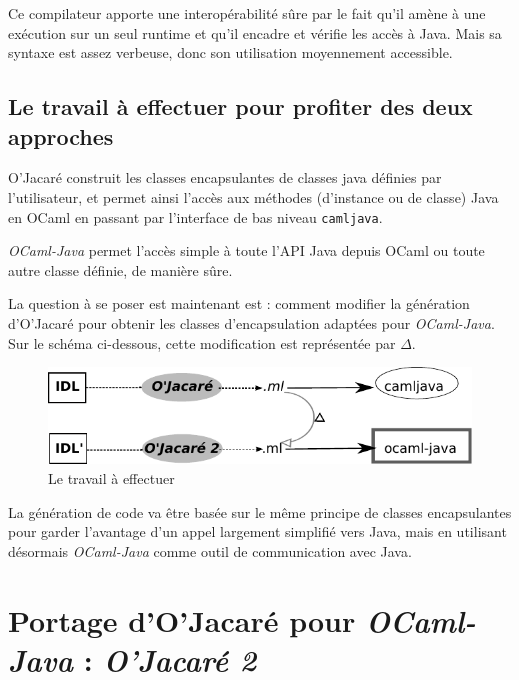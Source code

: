 \documentclass[a4paper, 11pt]{article}
\newcommand{\camljava}{{\tt{camljava}}}
\begin{document}
Ce compilateur apporte une interopérabilité sûre par le fait qu'il amène à une exécution sur un seul runtime et qu'il encadre et vérifie les accès à Java.
Mais sa syntaxe est assez verbeuse, donc son utilisation moyennement accessible. 







\subsection{Le travail à effectuer pour profiter des deux approches }
O'Jacaré construit les classes encapsulantes de classes
java définies par l'utilisateur, et permet ainsi l'accès aux méthodes
(d'instance ou de classe) Java en OCaml en passant par l'interface de bas niveau \camljava.

\emph{OCaml-Java} permet l'accès simple à toute l'API Java depuis OCaml ou toute autre classe définie, de manière sûre. 

La question à se poser est maintenant est : comment modifier la génération d’O’Jacaré pour obtenir les classes d’encapsulation adaptées pour \emph{OCaml-Java}. Sur le schéma ci-dessous, cette modification est représentée par $\Delta$.

\begin{figure}[h]
  \centering
  \includegraphics{schema1.pdf}
  \caption{Le travail à effectuer}
\end{figure}

La génération de code va être basée sur le même principe de classes encapsulantes pour garder l'avantage d'un appel largement simplifié vers Java, mais en utilisant désormais \emph{OCaml-Java} comme outil de communication avec Java.





\newpage
\section{Portage d'O'Jacaré pour \emph{OCaml-Java} : \emph{O'Jacaré 2} }
\end{document}

